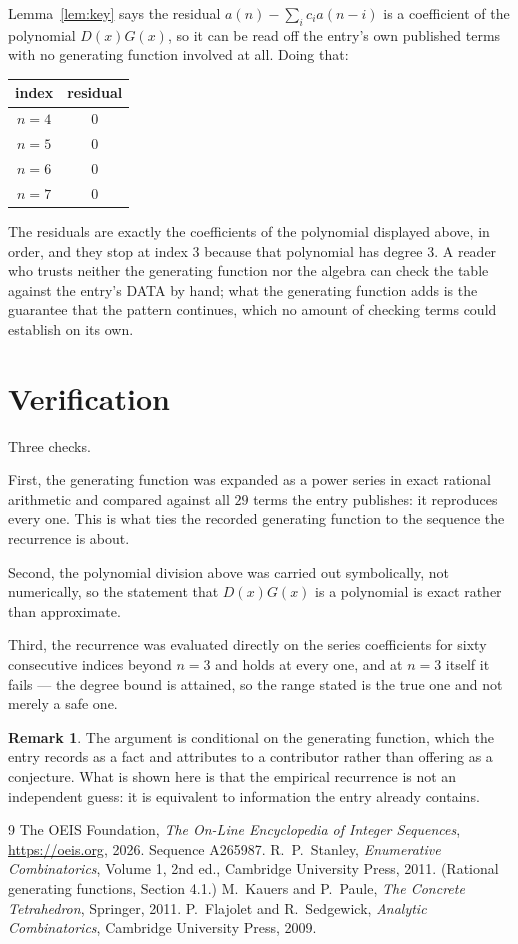 \documentclass[11pt,a4paper]{article}
\theoremstyle{plain}
\theoremstyle{definition}
\newtheorem{remark}[theorem]{Remark}
\begin{document}
Lemma~\ref{lem:key} says the residual $a(n)-\sum_ic_ia(n-i)$ is a coefficient of the
polynomial $D(x)G(x)$, so it can be read off the entry's own published terms with no
generating function involved at all. Doing that:
\begin{center}
\begin{tabular}{cc}
index & residual \\ \hline
$n=4$ & $0$ \\
$n=5$ & $0$ \\
$n=6$ & $0$ \\
$n=7$ & $0$
\end{tabular}
\end{center}
The residuals are exactly the coefficients of the polynomial displayed above, in order, and
they stop at index $3$ because that polynomial has degree $3$. A reader who trusts
neither the generating function nor the algebra can check the table against the entry's DATA
by hand; what the generating function adds is the guarantee that the pattern continues, which
no amount of checking terms could establish on its own.

\section{Verification}

Three checks.

First, the generating function was expanded as a power series in exact rational arithmetic and
compared against all $29$ terms the entry publishes: it reproduces every one. This is
what ties the recorded generating function to the sequence the recurrence is about.

Second, the polynomial division above was carried out symbolically, not numerically, so the
statement that $D(x)G(x)$ is a polynomial is exact rather than approximate.

Third, the recurrence was evaluated directly on the series coefficients for sixty consecutive
indices beyond $n=3$ and holds at every one, and at $n=3$ itself it fails --- the
degree bound is attained, so the range stated is the true one and not merely a safe one.

\begin{remark}
The argument is conditional on the generating function, which the entry records as a fact and
attributes to a contributor rather than offering as a conjecture. What is shown here is that
the empirical recurrence is not an independent guess: it is equivalent to information the
entry already contains.
\end{remark}

\begin{thebibliography}{9}
 The OEIS Foundation, \emph{The On-Line Encyclopedia of Integer
Sequences}, \url{https://oeis.org}, 2026. Sequence A265987.
 R.~P.~Stanley, \emph{Enumerative Combinatorics}, Volume 1, 2nd ed.,
Cambridge University Press, 2011. (Rational generating functions, Section 4.1.)
 M.~Kauers and P.~Paule, \emph{The Concrete Tetrahedron}, Springer, 2011.
 P.~Flajolet and R.~Sedgewick, \emph{Analytic Combinatorics}, Cambridge
University Press, 2009.
\end{thebibliography}
\end{document}
